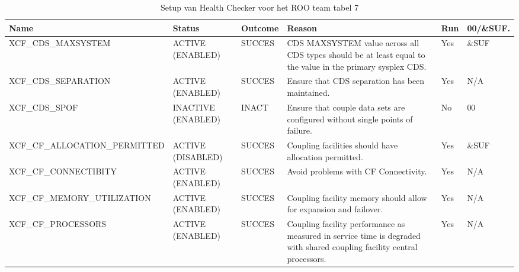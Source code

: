 \begin{landscape}
	\begin{table}[h]
		\begin{tabular}{|l|p{2.3cm}|l|p{4.5cm}|l|l|}
			\hline
			\textbf{Name}                       & \textbf{Status}   & \textbf{Outcome} & \textbf{Reason}    & \textbf{Run} &	\textbf{00/\&SUF.} \\ \hline
			XCF\_CDS\_MAXSYSTEM            & ACTIVE (ENABLED)   & SUCCES & CDS   MAXSYSTEM value across all CDS types should be at least equal to the value    in the   primary sysplex CDS.             & Yes & \&SUF \\ \hline
			XCF\_CDS\_SEPARATION           & ACTIVE (ENABLED)   & SUCCES & Ensure that CDS separation has been maintained.                                                                               & Yes & N/A   \\ \hline
			XCF\_CDS\_SPOF                 & INACTIVE (ENABLED) & INACT  & Ensure   that couple data sets are configured without single points of failure.                                               & No  & 00    \\ \hline
			XCF\_CF\_ALLOCATION\_PERMITTED & ACTIVE (DISABLED)  & SUCCES & Coupling   facilities should have allocation permitted.                                                                       & Yes & \&SUF \\ \hline
			XCF\_CF\_CONNECTIBITY          & ACTIVE (ENABLED)   & SUCCES & Avoid   problems with CF Connectivity.                                                                                        & Yes & N/A   \\ \hline
			XCF\_CF\_MEMORY\_UTILIZATION   & ACTIVE (ENABLED)   & SUCCES & Coupling   facility memory should allow for expansion and failover.                                                           & Yes & N/A   \\ \hline
			XCF\_CF\_PROCESSORS            & ACTIVE (ENABLED)   & SUCCES & Coupling   facility performance as measured in service time is degraded with   shared   coupling facility central processors. & Yes & N/A   \\ \hline	
		\end{tabular}
		\caption[Health Checker ROO team tabel 7]{Setup van Health Checker voor het ROO team tabel 7}
		\label{tbl:ROO Team Tabel 7}
	\end{table}
\end{landscape}

